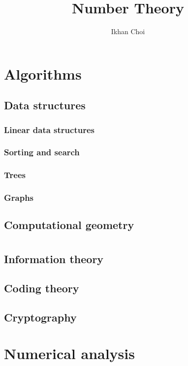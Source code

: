 \documentclass{../note}
\begin{document}
\title{Number Theory}
\author{Ikhan Choi}
\maketitle
\tableofcontents
\part{Algorithms}
\chapter{Data structures}
\section{Linear data structures}
\section{Sorting and search}
\section{Trees}
\section{Graphs}
\chapter{Computational geometry}




\part{}
\chapter{Information theory}
\chapter{Coding theory}
\chapter{Cryptography}




\part{Numerical analysis}
\end{document}
